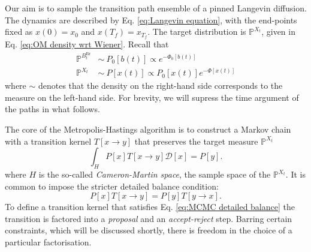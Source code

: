 Our aim is to sample the transition path ensemble of a pinned Langevin diffusion. The dynamics are described by Eq. \ref{eq:Langevin equation}, with the end-points fixed as $x(0)=x_0$ and $x(T_f)=x_{T_f}$. The target distribution is $\mathbb{P}^{X_t}$, given in Eq. \ref{eq:OM density wrt Wiener}. Recall that
\begin{subequations}
\begin{align}
\mathbb{P}^{B^\text{Br}_t} & \sim\ P_0[b(t)] \propto e^{-\Phi_0[b(t)]}  \\
\mathbb{P}^{X_t} & \sim\ P[x(t)] \propto P_0[x(t)] e^{-\Phi[x(t)]}
\end{align}
\end{subequations}
where $\sim$ denotes that the density on the right-hand side corresponds to the measure on the left-hand side. For brevity, we will supress the time argument of the paths in what follows.

The core of the Metropolis-Hastings algorithm is to construct a Markov chain with a transition kernel $T[x \to y]$ that preserves the target measure $\mathbb{P}^{X_t}$
\begin{equation}
\int_H P[x] T[x \to y] \mathcal{D}[x] = P[y].
\end{equation}
where $H$ is the so-called \textit{Cameron-Martin space}, the sample space of the $\mathbb{P}^{X_t}$. It is common to impose the stricter detailed balance condition:
\begin{equation} \label{eq:MCMC detailed balance}
P[x] T[x \to y]  = P[y] T[y \to x] .
\end{equation}
To define a transition kernel that satisfies Eq. \ref{eq:MCMC detailed balance} the transition is factored into a \textit{proposal} and an \textit{accept-reject} step. Barring certain constraints, which will be discussed shortly, there is freedom in the choice of a particular factorisation.

